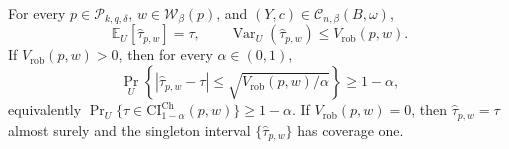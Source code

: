 For every \(p\in\mathcal P_{k,q,\delta}\), \(w\in\mathcal W_\beta(p)\), and \((Y,c)\in\mathcal C_{n,\beta}(B,\omega)\), \[\mathbb E_U[\widehat\tau_{p,w}]=\tau,\qquad \operatorname{Var}_U(\widehat\tau_{p,w})\le V_{\mathrm{rob}}(p,w).\] If \(V_{\mathrm{rob}}(p,w)>0\), then for every \(\alpha\in(0,1)\), \[\Pr_U\!\left\{|\widehat\tau_{p,w}-\tau|\le\sqrt{V_{\mathrm{rob}}(p,w)/\alpha}\right\}\ge1-\alpha,\] equivalently \(\Pr_U\{\tau\in\mathrm{CI}^{\mathrm{Ch}}_{1-\alpha}(p,w)\}\ge1-\alpha\). If \(V_{\mathrm{rob}}(p,w)=0\), then \(\widehat\tau_{p,w}=\tau\) almost surely and the singleton interval \(\{\widehat\tau_{p,w}\}\) has coverage one.